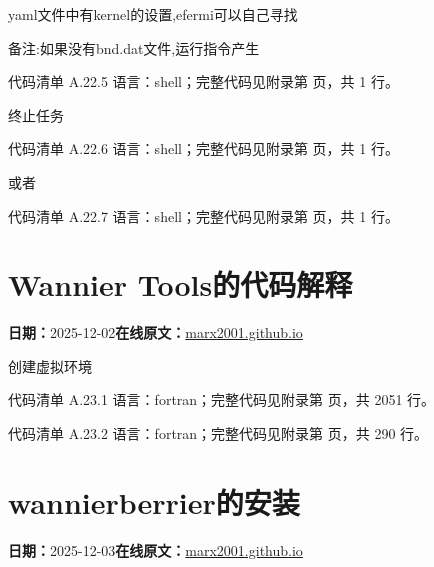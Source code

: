 \documentclass[lang=cn,scheme=chinese,color=blue,device=normal,toc=onecol,math=cm]{elegantbook}
\begin{document}
yaml文件中有kernel的设置,efermi可以自己寻找\par


备注:如果没有bnd.dat文件,运行指令产生\par


\begin{codeindexbox}{代码清单 A.22.5}
语言：shell；完整代码见附录第 \pageref{code:22:5} 页，共 1 行。
\end{codeindexbox}


终止任务\par


\begin{codeindexbox}{代码清单 A.22.6}
语言：shell；完整代码见附录第 \pageref{code:22:6} 页，共 1 行。
\end{codeindexbox}


或者\par


\begin{codeindexbox}{代码清单 A.22.7}
语言：shell；完整代码见附录第 \pageref{code:22:7} 页，共 1 行。
\end{codeindexbox}



\section{Wannier Tools的代码解释}
\begin{articlemeta}
\textbf{日期：}2025-12-02\hfill\textbf{在线原文：}\href{https://marx2001.github.io/sci-note\_posts/20251202-code}{marx2001.github.io}
\end{articlemeta}

创建虚拟环境\par


\begin{codeindexbox}{代码清单 A.23.1}
语言：fortran；完整代码见附录第 \pageref{code:23:1} 页，共 2051 行。
\end{codeindexbox}


\begin{codeindexbox}{代码清单 A.23.2}
语言：fortran；完整代码见附录第 \pageref{code:23:2} 页，共 290 行。
\end{codeindexbox}



\section{wannierberrier的安装}
\begin{articlemeta}
\textbf{日期：}2025-12-03\hfill\textbf{在线原文：}\href{https://marx2001.github.io/sci-note\_posts/20251203-wann}{marx2001.github.io}
\end{articlemeta}
\end{document}
